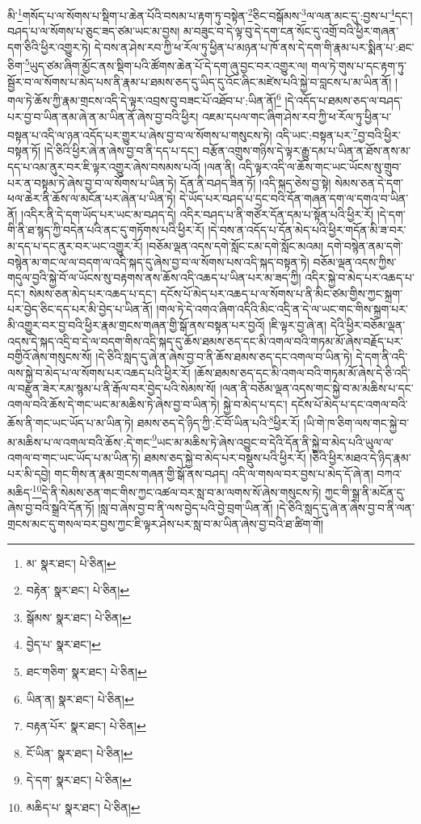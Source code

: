 མི་\footnote{མ་  སྣར་ཐང་།  པེ་ཅིན། }གསོད་པ་ལ་སོགས་པ་སྡིག་པ་ཆེན་པོའི་བསམ་པ་རྟག་ཏུ་བསྟེན་\footnote{བརྟེན་  སྣར་ཐང་།  པེ་ཅིན། }ཅིང་བསྒོམས་\footnote{སྒོམས་  སྣར་ཐང་།  པེ་ཅིན། }ལ་ལན་མང་དུ་:བྱས་པ་\footnote{བྱེད་པ་  སྣར་ཐང་། }དང་། བཤད་པ་ལ་སོགས་པ་ཅུང་ཟད་ཙམ་ཡང་མ་བྱས། མ་བཟུང་བ་དེ་ལྟ་བུ་དེ་དག་ངན་སོང་དུ་འགྲོ་བའི་ཕྱིར་གཞན་དག་ཅིའི་ཕྱིར་འགྱུར་ཏེ། དེ་བས་ན་ཤེས་རབ་ཀྱི་ཕ་རོལ་ཏུ་ཕྱིན་པ་མཉན་པ་ཁོ་ནས་དེ་དག་གི་རྣམ་པར་སྨིན་པ་:ཐང་ཅིག་\footnote{ཐང་གཅིག་  སྣར་ཐང་།  པེ་ཅིན། }ཡུད་ཙམ་ཞིག་མྱོང་ནས་སྡིག་པའི་ཚོགས་ཆེན་པོ་དེ་དག་ཞུ་བྱང་བར་འགྱུར་ལ། གལ་ཏེ་གུས་པ་དང་རྟག་ཏུ་སྦྱོར་བ་ལ་སོགས་པ་མེད་པས་ནི་རྣམ་པ་ཐམས་ཅད་དུ་ཡིད་དུ་འོང་ཞིང་མཛེས་པའི་སྐྱེ་བ་བླངས་པ་མ་ཡིན་ནོ། །གལ་ཏེ་ཆོས་ཀྱི་རྣམ་གྲངས་འདི་དེ་ལྟར་འབྲས་བུ་བཟང་པོ་འཐོབ་པ་:ཡིན་ནོ།\footnote{ཡིན་ན།  སྣར་ཐང་།  པེ་ཅིན། } །དེ་འདོད་པ་ཐམས་ཅད་ལ་བཤད་པར་བྱ་བ་ཡིན་ནམ་ཞེ་ན་མ་ཡིན་ནོ་ཞེས་བྱ་བའི་ཕྱིར། འཇམ་དཔལ་གང་ཞིག་ཤེས་རབ་ཀྱི་ཕ་རོལ་ཏུ་ཕྱིན་པ་བསྟན་པ་འདི་ལ་ཉན་འདོད་པར་གྱུར་པ་ཞེས་བྱ་བ་ལ་སོགས་པ་གསུངས་ཏེ། འདི་ཡང་:བསྟན་པར་\footnote{བརྟན་པོར་  སྣར་ཐང་།  པེ་ཅིན། }བྱ་བའི་ཕྱིར་བསྟན་ཏོ། །དེ་ཅིའི་ཕྱིར་ཞེ་ན་ཞེས་བྱ་བ་ནི་དད་པ་དང་། བརྩོན་འགྲུས་གཉིས་དེ་ལྟར་རྒྱུ་དམ་པ་ཡིན་ན་ཐོས་ནས་མ་དད་པ་འམ་ནུར་བར་ཇི་ལྟར་འགྱུར་ཞེས་བསམས་པའོ། །ལན་ནི། འདི་ལྟར་འདི་ལ་ཆོས་གང་ཡང་ཡོངས་སུ་གྲུབ་པར་ན་བསྟམ་ཏེ་ཞེས་བྱ་བ་ལ་སོགས་པ་ཡིན་ཏེ། དོན་ནི་བཤད་ཟིན་ཏོ། །འདི་སྐད་ཅེས་བྱ་སྟེ། སེམས་ཅན་དེ་དག་ཕལ་ཆེར་ནི་ཆོས་ལ་མངོན་པར་ཞེན་པ་ཡིན་ཏེ། དེ་ཡོད་པར་བཤད་པ་དྲང་བའི་དོན་གཞན་དག་ལ་དགའ་བ་ཡིན་ནོ། །འདིར་ནི་དེ་དག་ཡོད་པར་ཡང་མ་བཤད་དེ། འདིར་བཤད་པ་ནི་གཙོར་དོན་དམ་པ་སྟོན་པའི་ཕྱིར་རོ། །དེ་དག་གི་ནི་ཐ་སྙད་ཀྱི་བདེན་པའི་ནང་དུ་གཏོགས་པའི་ཕྱིར་རོ། །དེ་བས་ན་འདོད་པ་དོན་མེད་པའི་ཕྱིར་གདོན་མི་ཟ་བར་མ་དད་པ་དང་ནུར་བར་ཡང་འགྱུར་རོ། །བཅོམ་ལྡན་འདས་དགེ་སློང་ངམ་དགེ་སློང་མའམ། དགེ་བསྙེན་ནམ་དགེ་བསྙེན་མ་གང་ལ་ལ་བདག་ལ་འདི་སྐད་དུ་ཞེས་བྱ་བ་ལ་སོགས་པས་འདི་སྐད་བསྟན་ཏེ། བཅོམ་ལྡན་འདས་ཀྱིས་གདུལ་བྱའི་སྐྱེ་བོ་ལ་ཡོངས་སུ་བརྟགས་ནས་ཆོས་འདི་འཆད་པ་ཡིན་པར་མ་ཟད་ཀྱི། འདིར་སྐྱེ་བ་མེད་པར་འཆད་པ་དང་། སེམས་ཅན་མེད་པར་འཆད་པ་དང་། དངོས་པོ་མེད་པར་འཆད་པ་ལ་སོགས་པ་ནི་མིང་ཙམ་གྱིས་ཀྱང་སྐྲག་པར་བྱེད་ཅིང་དད་པར་མི་བྱེད་པ་ཡིན་ནོ། །གལ་ཏེ་དེ་འགའ་ཞིག་འདིའི་མིང་འདྲི་ན་དེ་ལ་ཡང་གང་གིས་སྐྲག་པར་མི་འགྱུར་བར་བྱ་བའི་ཕྱིར་རྣམ་གྲངས་གཞན་གྱི་སྒོ་ནས་བསྟན་པར་བྱའོ། །ཇི་ལྟར་བྱ་ཞེ་ན། དེའི་ཕྱིར་བཅོམ་ལྡན་འདས་དེ་སྐད་འདྲི་བ་དེ་ལ་བདག་གིས་འདི་སྐད་དུ་ཆོས་ཐམས་ཅད་དང་མི་འགལ་བའི་གཏམ་མོ་ཞེས་བརྗོད་པར་བགྱིའོ་ཞེས་གསུངས་སོ། །དེ་ཅིའི་སླད་དུ་ཞེ་ན་ཞེས་བྱ་བ་ནི་ཆོས་ཐམས་ཅད་དང་འགལ་བ་ཡིན་ཏེ། དེ་དག་ནི་འདི་ལས་སྐྱེ་བ་མེད་པ་ལ་སོགས་པར་འཆད་པའི་ཕྱིར་རོ། །ཆོས་ཐམས་ཅད་དང་མི་འགལ་བའི་གཏམ་མོ་ཞེས་དེ་ཅི་འདི་ལ་བརྫུན་ཟེར་རམ་སྙམ་པ་ནི་རྒོལ་བར་བྱེད་པའི་སེམས་སོ། །ལན་ནི་བཅོམ་ལྡན་འདས་གང་སྐྱེ་བ་མ་མཆིས་པ་དང་འགལ་བའི་ཆོས་དེ་གང་ཡང་མ་མཆིས་ཏེ་ཞེས་བྱ་བ་ཡིན་ཏེ། སྐྱེ་བ་མེད་པ་དང་། དངོས་པོ་མེད་པ་དང་འགལ་བའི་ཆོས་ནི་གང་ཡང་ཡོད་པ་མ་ཡིན་ཏེ། ཐམས་ཅད་དེ་ཉིད་ཀྱི་:ངོ་བོ་ཡིན་པའི་\footnote{ངོ་ཡིན་  སྣར་ཐང་།  པེ་ཅིན། }ཕྱིར་རོ། །ཡི་གེ་ཁ་ཅིག་ལས་གང་སྐྱེ་བ་མ་མཆིས་པ་ལ་འགལ་བའི་ཆོས་:དེ་གང་\footnote{དེ་དག་  སྣར་ཐང་།  པེ་ཅིན། }ཡང་མ་མཆིས་ཏེ་ཞེས་འབྱུང་བ་དེའི་དོན་ནི་སྐྱེ་བ་མེད་པའི་ཡུལ་ལ་འགལ་བ་གང་ཡང་ཡོད་པ་མ་ཡིན་ཏེ། ཐམས་ཅད་སྐྱེ་བ་མེད་པར་བསྡུས་པའི་ཕྱིར་རོ། །ཅིའི་ཕྱིར་མཐའ་དེ་ཉིད་རྣམ་པར་མི་དབྱེ། གང་གིས་ན་རྣམ་གྲངས་གཞན་གྱི་སྒོ་ནས་བཤད། འདི་ལ་གསལ་བར་བྱས་པ་མེད་དོ་ཞེ་ན། བཀའ་མཆིད་\footnote{མཆིད་པ་  སྣར་ཐང་།  པེ་ཅིན། }དེ་ནི་སེམས་ཅན་གང་གིས་ཀྱང་འཚལ་བར་སླ་བ་མ་ལགས་སོ་ཞེས་གསུངས་ཏེ། ཀྱང་གི་སྒྲ་ནི་མངོན་དུ་ཞེས་བྱ་བའི་སྒྲའི་དོན་ཏོ། །སླ་བ་ཞེས་བྱ་བ་ནི་ལས་བྱེད་པའི་བྱེ་བྲག་ཡིན་ནོ། །དེ་ཅིའི་སླད་དུ་ཞེ་ན་ཞེས་བྱ་བ་ནི་ལན་གྲངས་མང་དུ་གསལ་བར་བྱས་ཀྱང་ཇི་ལྟར་ཤེས་པར་སླ་བ་མ་ཡིན་ཞེས་བྱ་བའི་ཐ་ཚིག་གོ། 